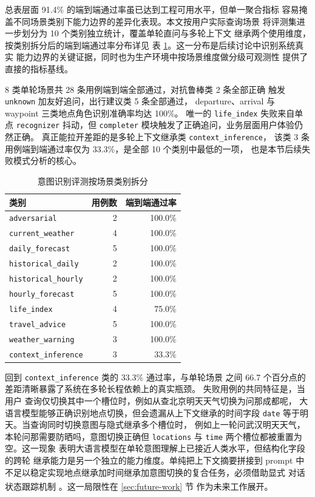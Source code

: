 \documentclass[a4paper]{article}
\newcommand{\song}{\CJKfamily{song}}
\theoremstyle{definition}
\theoremstyle{plain}
\theoremstyle{remark}
\newcommand{\reftab}[1]{表 \ref{#1}}
\let\oldcite\cite
\renewcommand{\cite}[1]{\textsuperscript{\oldcite{#1}}}
\newcommand{\bk}{\discretionary{}{}{}}
\begin{document}
总表层面 91.4\% 的端到端通过率虽已达到工程可用水平，但单一聚合指标
容易掩盖不同场景类别下能力边界的差异化表现。本文按用户实际查询场景
将评测集进一步划分为 10 个类别独立统计，覆盖单轮直问与多轮上下文
继承两个使用维度，按类别拆分后的端到端通过率分布详见
\reftab{tab:intent-by-category}。这一分布是后续讨论中识别系统真实
能力边界的关键证据，同时也为生产环境中按场景维度做分级可观测性
提供了直接的指标基线。

8 类单轮场景共 28 条用例端到端全部通过，对抗鲁棒类 2 条全部正确
触发 \texttt{unknown} 加友好追问，出行建议类 5 条全部通过，
departure、arrival 与 waypoint 三类地点角色识别准确率均达 100\%。
唯一的 \texttt{life\_\bk{}index} 失败来自单点 \texttt{recognizer} 抖动，但
\texttt{completer} 模块触发了正确追问，业务层面用户体验仍然正确。
真正能拉开差距的是多轮上下文继承类 \texttt{context\_\bk{}inference}，
该类 3 条用例端到端通过率仅为 33.3\%，是全部 10 个类别中最低的一项，
也是本节后续失败模式分析的核心。

\begin{table}[!t]
    \centering
    \caption{意图识别评测按场景类别拆分}
    \label{tab:intent-by-category}
    \song\fontsize{9pt}{12pt}\selectfont
    \renewcommand{\arraystretch}{0.95}
    \begin{tabular}{lrr}
        \toprule
        类别 & 用例数 & 端到端通过率 \\
        \midrule
        \texttt{adversarial} & 2 & 100.0\% \\
        \texttt{current\_\bk{}weather} & 4 & 100.0\% \\
        \texttt{daily\_\bk{}forecast} & 5 & 100.0\% \\
        \texttt{historical\_\bk{}daily} & 2 & 100.0\% \\
        \texttt{historical\_\bk{}hourly} & 2 & 100.0\% \\
        \texttt{hourly\_\bk{}forecast} & 5 & 100.0\% \\
        \texttt{life\_\bk{}index} & 4 & 75.0\% \\
        \texttt{travel\_\bk{}advice} & 5 & 100.0\% \\
        \texttt{weather\_\bk{}warning} & 3 & 100.0\% \\
        \texttt{context\_\bk{}inference} & 3 & 33.3\% \\
        \bottomrule
    \end{tabular}
\end{table}

回到 \texttt{context\_\bk{}inference} 类的 33.3\% 通过率，与单轮场景
之间 66.7 个百分点的差距清晰暴露了系统在多轮长程依赖上的真实瓶颈。
失败用例的共同特征是，当用户
查询仅切换其中一个槽位时，例如从查北京明天天气切换为问那成都呢，
大语言模型能够正确识别地点切换，但会遗漏从上下文继承的时间字段
\texttt{date} 等于明天。当查询同时切换意图与隐式继承多个槽位时，
例如上一轮问武汉明天天气，本轮问那需要防晒吗，意图切换正确但
\texttt{locations} 与 \texttt{time} 两个槽位都被重置为空。这一现象
表明大语言模型在单轮意图理解上已接近人类水平，但结构化字段的跨轮
继承能力是另一个独立的能力维度。单纯把上下文摘要拼接到 prompt 中
不足以稳定实现地点继承加时间继承加意图切换的复合任务，必须借助显式
对话状态跟踪机制 \cite{ref29}。这一局限性在 \ref{sec:future-work} 节
作为未来工作展开。
\end{document}
